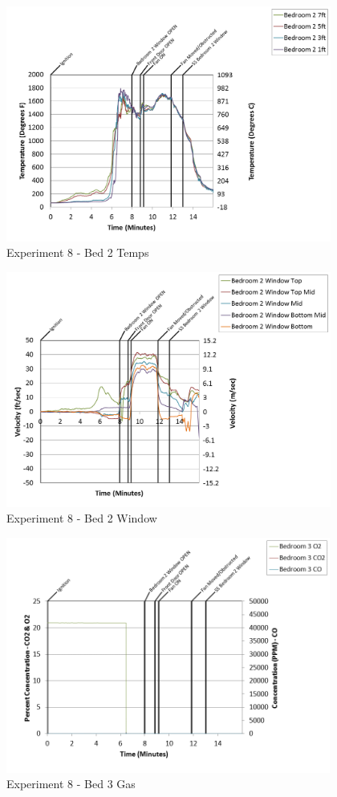 \documentclass{article}
\begin{document}
\begin{appendices}
\clearpage

\begin{figure}[h!]
	\centering
	\includegraphics[height=3.05in]{0_Images/Results_Charts/Exp_8_Charts/Bed2Temps.png}
	\caption{Experiment 8 - Bed 2 Temps}
\end{figure}


\begin{figure}[h!]
	\centering
	\includegraphics[height=3.05in]{0_Images/Results_Charts/Exp_8_Charts/Bed2Window.png}
	\caption{Experiment 8 - Bed 2 Window}
\end{figure}

\clearpage

\begin{figure}[h!]
	\centering
	\includegraphics[height=3.05in]{0_Images/Results_Charts/Exp_8_Charts/Bed3Gas.png}
	\caption{Experiment 8 - Bed 3 Gas}
\end{figure}



\end{appendices}
\end{document}
